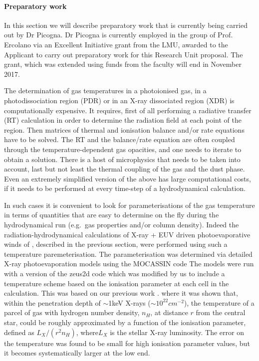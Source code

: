 \documentclass[10pt,fleqn,twoside]{article}
\begin{document}
\paragraph{Preparatory work}

In this section we will describe
preparatory work that is currently being carried out by Dr
Picogna. Dr Picogna is currently employed in the group of Prof. Ercolano via
an Excellent Initiative grant from the LMU, awarded to the Applicant to carry
out preparatory work for this Research Unit proposal. The grant, which
was extended using funds from the faculty will end in November
2017. 

The determination of gas temperatures in a photoionised gas, in a
photodissociation region (PDR) or in an X-ray dissociated region (XDR)
is computationally expensive. It requires, first of all 
performing a radiative transfer (RT) calculation in order to determine the
radiation field at each point of the region. Then matrices of thermal and
ionisation balance and/or rate equations have to be solved. The RT and
the balance/rate equation are often coupled through the
temperature-dependent gas opacities, and one needs to iterate to
obtain a solution. There is a host of microphysics
that needs to be taken into account, last but not least the thermal
coupling of the gas and the dust phase. Even an extremely simplified
version of the above has large computational costs, if it needs to be performed at
every time-step of a hydrodynamical calculation. 

In such cases it is convenient to look for parameterisations of the
gas temperature in terms of quantities that are easy to determine on
the fly during the hydrodynamical run (e.g.\ gas properties and/or column density). 
Indeed the radiation-hydrodynamical calculations of X-ray + EUV driven
photoevaporative winds of 
\citet{2010MNRAS.401.1415O, 2011MNRAS.412...13O, 2012MNRAS.422.1880O},
described in the previous section, were performed
using such a temperature paremeterisation. The parameterisation was
determined via detailed X-ray photoevaporation models using the
MOCASSIN code 
\citep{2008ApJ...688..398E, 2009ApJ...699.1639E}
The models were run with a version of the {\sc
  zeus2d} code which was modified by us to include a temperature
scheme based on the ionisation parameter at each cell in the
calculation. 
This was based on our previous work 
\citep{2008ApJ...688..398E, 2009ApJ...699.1639E}.
where it was shown that, within the
penetration depth of $\sim$1keV X-rays ($\sim 10^{22}cm^{-2}$), the
temperature of a parcel of gas with hydrogen number density, $n_H$, at
distance $r$ from the central star, could be roughly approximated by a
function of the ionisation parameter, defined as $L_X/(r^2 n_H)$,
where$L_X$ is the stellar X-ray luminosity. The error on the
temperature was found to be small for high ionisation parameter values, but it
becomes systematically larger at the low end. 
\end{document}
